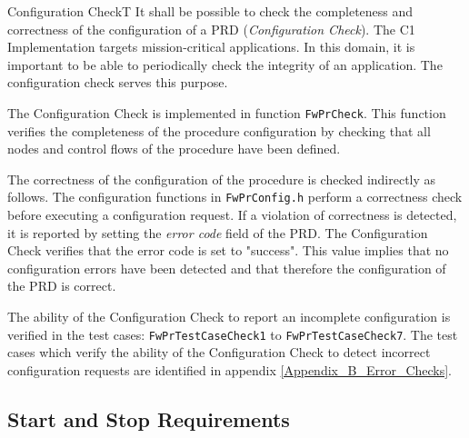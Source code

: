 \documentclass[requirements]{../fwprofile}
\begin{document}
\begin{fw_req}{Configuration Check}{T}
{It shall be possible to check the completeness and correctness of the 
configuration of a PRD (\emph{Configuration Check}).}
{The C1 Implementation targets mission-critical applications. 
In this domain, it is important to be able to periodically 
check the integrity of an application. 
The configuration check serves this purpose.}
{The Configuration Check is implemented in function \texttt{FwPrCheck}. 
This function verifies the completeness of the procedure configuration by checking that all nodes 
and control flows of the procedure have been defined. 

The correctness of the configuration of the procedure is checked indirectly as follows. 
The configuration functions in  \texttt{FwPrConfig.h} perform a correctness check before
executing a configuration request. 
If a violation of correctness is detected, it is reported by setting the \emph{error code} 
field of the PRD. 
The Configuration Check verifies that the error code is set to "success". 
This value implies that no configuration errors have been detected and that therefore the 
configuration of the PRD is correct.} 
{The ability of the Configuration Check to report an incomplete 
configuration is verified in the test cases: \texttt{FwPrTestCaseCheck1} 
to \texttt{FwPrTestCaseCheck7}. 
The test cases which verify the ability of the Configuration Check to detect incorrect 
configuration requests are identified in appendix \ref{Appendix_B_Error_Checks}.}
\end{fw_req}

\subsection{Start and Stop Requirements}\label{req:startStopInterfacePRD}
\end{document}
